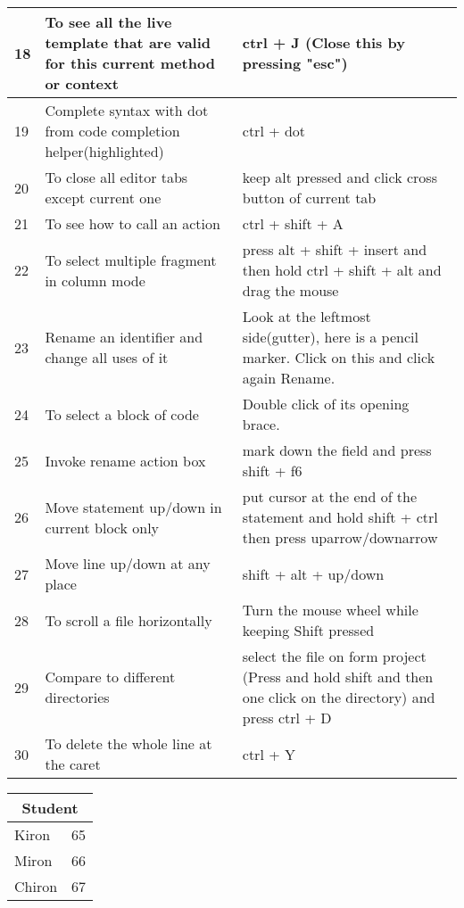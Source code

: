 \documentclass[11 pt]{article}
\begin{document}
\begin{center}
\begin{longtable}{|||| m{1 em} || m{15 em} m{17 em} ||||}
		\hline
		18 & To see all the live template that are valid for this current method or context & ctrl + J (Close this by pressing "esc")\\
		\hline
		19 & Complete syntax with dot from code completion helper(highlighted) & ctrl + dot\\
		\hline
		20 & To close all editor tabs except current one & keep alt pressed and click cross button of current tab\\
		\hline
		21 & To see how to call an action & ctrl + shift + A\\
		\hline
		22 & To select multiple fragment in column mode & press alt + shift + insert and then hold ctrl + shift + alt and drag the mouse\\
		\hline
		23 & Rename an identifier and change all uses of it & Look at the leftmost side(gutter), here is a pencil marker. Click on this and click again Rename.\\
		\hline
		24 & To select a block of code & Double click of its opening brace.\\
		\hline
		25 & Invoke rename action box & mark down the field and press shift + f6\\
		\hline
		26 & Move statement up/down in current block only & put cursor at the end of the statement and hold shift + ctrl then press uparrow/downarrow\\
		\hline
		27 & Move line up/down at any place & shift + alt + up/down\\
		\hline
		28 & To scroll a file horizontally & Turn the mouse wheel while keeping Shift pressed\\
		\hline
		29 & Compare to different directories & select the file on form project (Press and hold shift and then one click on the directory) and press ctrl + D\\
		\hline
		30 & To delete the whole line at the caret & ctrl + Y\\
		\hline\hline
	\end{longtable}
\end{center}


\begin{tabular}{| p{5 em} | p{5 em} |}
	\hline\hline
	\multicolumn{2}{c}{Student}\\
	\hline\hline
	Kiron & 65\\
	\hline
	Miron & 66\\
	\hline
	Chiron & 67\\
	\hline
\end{tabular}
\end{document}
